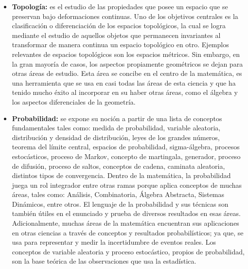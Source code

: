 \begin{itemize}
    \color{blue} \item \color{black} \textbf{Topología:} es el estudio de las propiedades que posee un espacio que se preservan bajo deformaciones continuas. Uno de los objetivos centrales es la clasificación o diferenciación de los espacios topológicos, la cual se logra mediante el estudio de aquellos objetos que permanecen invariantes al transformar de manera continua un espacio topológico en otro. Ejemplos relevantes de espacios topológicos son los espacios métricos. Sin embargo, en la gran mayoría de casos, los aspectos propiamente geométricos se dejan para otras áreas de estudio. Esta área se concibe en el centro de la matemática, es una herramienta que se usa en casi todas las áreas de esta ciencia y que ha tenido mucho éxito al incorporar en su haber otras áreas, como el álgebra y los aspectos diferenciales de la geometría.
    
     \color{blue} \item \color{black} \textbf{Probabilidad:} se expone su noción a partir de una lista de conceptos fundamentales tales como: medida de probabilidad, variable aleatoria, distribución y densidad de distribución, leyes de los grandes números, teorema del límite central, espacios de probabilidad, sigma-álgebra, procesos estocásticos, proceso de Markov, concepto de martingala, generador, proceso de difusión, proceso de saltos, conceptos de cadena, caminata aleatoria, distintos tipos de convergencia. Dentro de la matemática, la probabilidad juega un rol integrador entre otras ramas porque aplica conceptos de muchas áreas, tales como: Análisis, Combinatoria, Álgebra Abstracta, Sistemas Dinámicos, entre otros. El lenguaje de la probabilidad y sus técnicas son también útiles en el enunciado y prueba de diversos resultados en esas áreas. Adicionalmente, muchas áreas de la matemática encuentran sus aplicaciones en otras ciencias a través de conceptos y resultados probabilísticos; ya que, se usa para representar y medir la incertidumbre de eventos reales. Los conceptos de variable aleatoria y proceso estocástico, propios de probabilidad, son la base teórica de las observaciones que usa la estadística.
     

\end{itemize}
